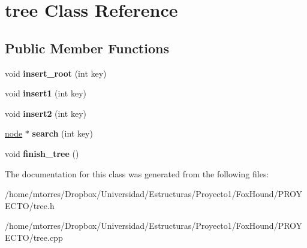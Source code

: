 \hypertarget{classtree}{\section{tree Class Reference}
\label{classtree}
}
\subsection*{Public Member Functions}
\begin{DoxyCompactItemize}
\item 
\hypertarget{classtree_acbfbccebf3d8482cb6a1a878ab99491f}{void {\bfseries insert\-\_\-root} (int key)}\label{classtree_acbfbccebf3d8482cb6a1a878ab99491f}

\item 
\hypertarget{classtree_aac63ed69d695ac263438cd5da4317b6a}{void {\bfseries insert1} (int key)}\label{classtree_aac63ed69d695ac263438cd5da4317b6a}

\item 
\hypertarget{classtree_aa4c44ce4c18a7341b34124d26e7a5563}{void {\bfseries insert2} (int key)}\label{classtree_aa4c44ce4c18a7341b34124d26e7a5563}

\item 
\hypertarget{classtree_a9a4e341c78d3559e5f6e3b0060530f05}{\hyperlink{structnode}{node} $\ast$ {\bfseries search} (int key)}\label{classtree_a9a4e341c78d3559e5f6e3b0060530f05}

\item 
\hypertarget{classtree_a86bf515529211e7f7d1f18892bf6fff5}{void {\bfseries finish\-\_\-tree} ()}\label{classtree_a86bf515529211e7f7d1f18892bf6fff5}

\end{DoxyCompactItemize}


The documentation for this class was generated from the following files\-:\begin{DoxyCompactItemize}
\item 
/home/mtorres/\-Dropbox/\-Universidad/\-Estructuras/\-Proyecto1/\-Fox\-Hound/\-P\-R\-O\-Y\-E\-C\-T\-O/tree.\-h\item 
/home/mtorres/\-Dropbox/\-Universidad/\-Estructuras/\-Proyecto1/\-Fox\-Hound/\-P\-R\-O\-Y\-E\-C\-T\-O/tree.\-cpp\end{DoxyCompactItemize}
